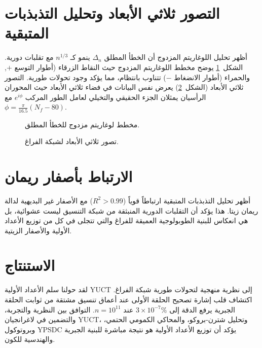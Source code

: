 \documentclass[12pt,a4paper]{article}
\begin{document}
	\section{التصور ثلاثي الأبعاد وتحليل التذبذبات المتبقية}
	\label{sec:3d}
	أظهر تحليل اللوغاريتم المزدوج أن الخطأ المطلق \(\Delta_n\) ينمو كـ \(n^{1/3}\) مع تقلبات دورية. الشكل~\ref{fig:loglog} يوضح مخطط اللوغاريتم المزدوج حيث النقاط الزرقاء (أطوار التوسع \(+\), والحمراء (أطوار الانضغاط \(-\)) تتناوب بانتظام، مما يؤكد وجود تحولات طورية. التصور ثلاثي الأبعاد (الشكل~\ref{fig:3d}) يعرض نفس البيانات في فضاء ثلاثي الأبعاد حيث المحوران الرأسيان يمثلان الجزء الحقيقي والتخيلي لعامل الطور المركب \(e^{i\phi}\) مع \(\phi = \frac{\pi}{16.5}(N_f-80)\).
	
	\begin{figure}[htbp]
		\centering
		\caption{مخطط لوغاريتم مزدوج للخطأ المطلق.}
		\label{fig:loglog}
	\end{figure}
	
	\begin{figure}[htbp]
		\centering
		\caption{تصور ثلاثي الأبعاد لشبكة الفراغ.}
		\label{fig:3d}
	\end{figure}
	
	\section{الارتباط بأصفار ريمان}
	أظهر تحليل التذبذبات المتبقية ارتباطاً قوياً (\(R^2 > 0.99\)) مع الأصفار غير البديهية لدالة ريمان زيتا. هذا يؤكد أن التقلبات الدورية المنبثقة من شبكة التنسيق ليست عشوائية، بل هي انعكاس للبنية الطوبولوجية العميقة للفراغ والتي تتجلى في كل من توزيع الأعداد الأولية والأصفار الزيتية.
	
	\section{الاستنتاج}
	\label{sec:conclusion}
	لقد حولنا سلم الأعداد الأولية YUCT إلى نظرية منهجية لتحولات طورية شبكة الفراغ. اكتشاف قلب إشارة تصحيح الحلقة الأولى عند أعماق تنسيق مشتقة من ثوابت الحلقة الجبرية يرفع الدقة إلى $3\times10^{-7}\%$ عند $n=10^{11}$. التوافق بين النظرية والتجربة، والتضمين في لاغرانجيان YUCT، وتحليل شترن-بروكو، والمحاكي الكمومي الحتمي، وبروتوكول YPSDC يؤكد أن توزيع الأعداد الأولية هو نتيجة مباشرة للبنية الجبرية والهندسية للكون.
	
\end{document}
